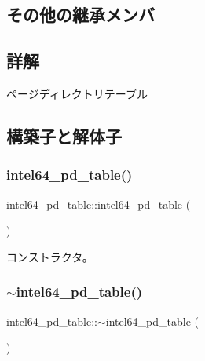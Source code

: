 \subsection*{その他の継承メンバ}


\subsection{詳解}
ページディレクトリテーブル 

\subsection{構築子と解体子}
\hypertarget{classintel64__pd__table_af7e62008481154d40e6d839df192d8e2}{}\label{classintel64__pd__table_af7e62008481154d40e6d839df192d8e2} 
\subsubsection{\texorpdfstring{intel64\+\_\+pd\+\_\+table()}{intel64\_pd\_table()}\hspace{0.1cm}{\footnotesize\ttfamily [1/3]}}
{\footnotesize\ttfamily intel64\+\_\+pd\+\_\+table\+::intel64\+\_\+pd\+\_\+table (\begin{DoxyParamCaption}{ }\end{DoxyParamCaption})}

コンストラクタ。 \hypertarget{classintel64__pd__table_afe82fc9da5be60f2df1b0a891e47998b}{}\label{classintel64__pd__table_afe82fc9da5be60f2df1b0a891e47998b} 
\subsubsection{\texorpdfstring{$\sim$intel64\+\_\+pd\+\_\+table()}{~intel64\_pd\_table()}}
{\footnotesize\ttfamily intel64\+\_\+pd\+\_\+table\+::$\sim$intel64\+\_\+pd\+\_\+table (\begin{DoxyParamCaption}{ }\end{DoxyParamCaption})\hspace{0.3cm}{\ttfamily [virtual]}}

